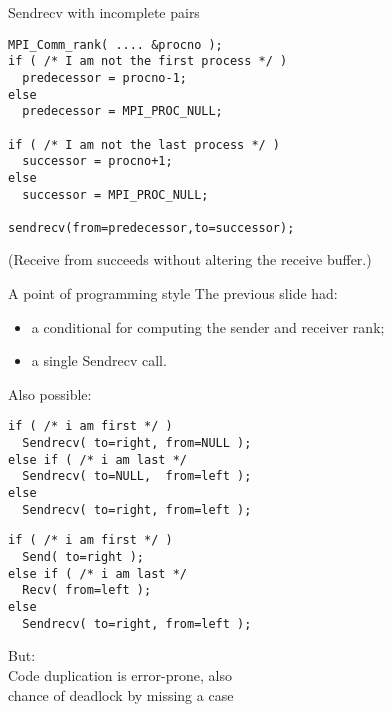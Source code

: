 \begin{numberedframe}{Sendrecv with incomplete pairs}
\lstset{language=C}
\begin{lstlisting}
MPI_Comm_rank( .... &procno );
if ( /* I am not the first process */ )
  predecessor = procno-1;
else
  predecessor = MPI_PROC_NULL;

if ( /* I am not the last process */ )
  successor = procno+1;
else
  successor = MPI_PROC_NULL;

sendrecv(from=predecessor,to=successor);  
\end{lstlisting}
(Receive from  succeeds without altering
the receive buffer.)
\begin{mpl}
  
\end{mpl}
\end{numberedframe}

\begin{numberedframe}{A point of programming style}
  The previous slide had:
  \begin{itemize}
  \item a conditional for computing the sender and receiver rank;
  \item a single Sendrecv call.
  \end{itemize}
  Also possible:
\lstset{language=C}
\begin{multicols}{2}
\small
\begin{lstlisting}
if ( /* i am first */ )
  Sendrecv( to=right, from=NULL );
else if ( /* i am last */
  Sendrecv( to=NULL,  from=left );
else 
  Sendrecv( to=right, from=left );
\end{lstlisting}
\begin{lstlisting}
if ( /* i am first */ )
  Send( to=right );
else if ( /* i am last */
  Recv( from=left );
else 
  Sendrecv( to=right, from=left );
\end{lstlisting}
\end{multicols}
But:\\
Code duplication is error-prone, also\\
chance of deadlock by missing a case
\end{numberedframe}

\begin{optexerciseframe}[rightsend]
  
\end{optexerciseframe}

\begin{exerciseframe}[sendrecv]
  
\end{exerciseframe}

